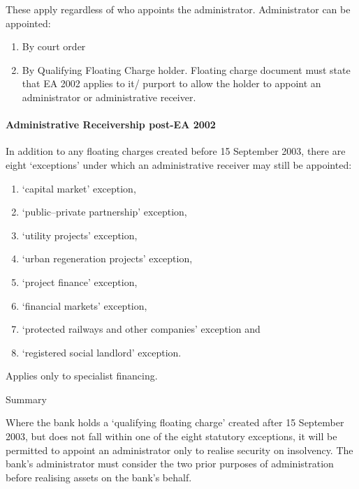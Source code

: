 \documentclass[
]{article}
\providecommand{\tightlist}{%
  \setlength{\itemsep}{0pt}\setlength{\parskip}{0pt}}
\newenvironment{env-a9aa42a3-f5ef-44bc-9cb3-81fc5caedba7}
{
    \savenotes\tcolorbox[blanker,breakable,left=5pt,borderline west={2pt}{-4pt}{gray}]
}
{
    \endtcolorbox\spewnotes
}
\begin{document}
These apply regardless of who appoints the administrator. Administrator
can be appointed:

\begin{enumerate}
\tightlist
\item
  By court order
\item
  By Qualifying Floating Charge holder. Floating charge document must
  state that EA 2002 applies to it/ purport to allow the holder to
  appoint an administrator or administrative receiver.
\end{enumerate}

\hypertarget{administrative-receivership-post-ea-2002}{%
\paragraph{Administrative Receivership post-EA
2002}\label{administrative-receivership-post-ea-2002}}

In addition to any floating charges created before 15 September 2003,
there are eight `exceptions' under which an administrative receiver may
still be appointed:

\begin{enumerate}
\tightlist
\item
  `capital market' exception,
\item
  `public--private partnership' exception,
\item
  `utility projects' exception,
\item
  `urban regeneration projects' exception,
\item
  `project finance' exception,
\item
  `financial markets' exception,
\item
  `protected railways and other companies' exception and
\item
  `registered social landlord' exception.
\end{enumerate}

Applies only to specialist financing.

\begin{env-a9aa42a3-f5ef-44bc-9cb3-81fc5caedba7}

Summary

Where the bank holds a `qualifying floating charge' created after 15
September 2003, but does not fall within one of the eight statutory
exceptions, it will be permitted to appoint an administrator only to
realise security on insolvency. The bank's administrator must consider
the two prior purposes of administration before realising assets on the
bank's behalf.

\end{env-a9aa42a3-f5ef-44bc-9cb3-81fc5caedba7}
\end{document}
